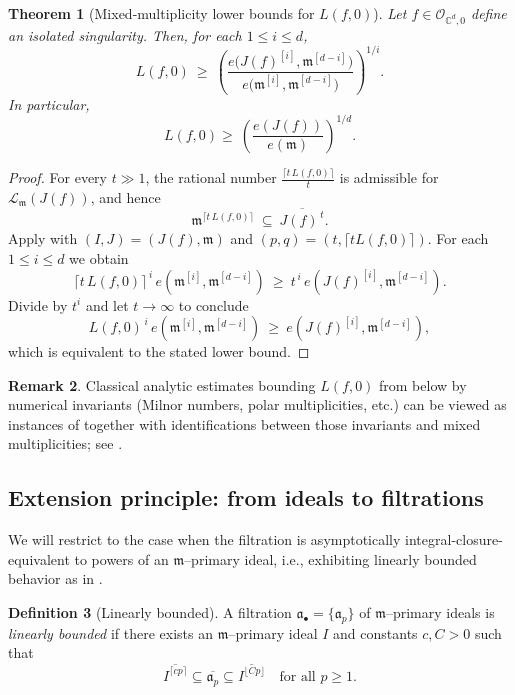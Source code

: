 \documentclass[12pt]{amsart}
\newcommand{\CC}{\mathbb{C}}
\newcommand{\m}{\mathfrak m}
\renewcommand{\a}{\mathfrak{a}}
\newcommand{\Loj}{\mathcal{L}} %
\newcommand{\abul}{{\a_\bullet}}
\theoremstyle{plain}
\newtheorem{theorem}{Theorem}[section]
\theoremstyle{definition}
\newtheorem{definition}[theorem]{Definition}
\newtheorem{remark}[theorem]{Remark}
\numberwithin{equation}{section}
\begin{document}
\begin{theorem}[Mixed-multiplicity lower bounds for $L(f,0)$]\label{thm:grad-mixed-lower}
Let $f\in\mathcal O_{\CC^d,0}$ define an isolated singularity.
Then, for each $1\le i\le d$,
\[
L(f,0)
\ \ge\
\left(\frac{e\bigl(J(f)^{[i]},\m^{[d-i]}\bigr)}
{e\bigl(\m^{[i]},\m^{[d-i]}\bigr)}\right)^{1/i}.
\]
In particular,
\[
L(f,0) \ge\ \left(\frac{e(J(f))}{e(\m)}\right)^{1/d}.
\]
\end{theorem}

\begin{proof}
For every $t\gg 1$, the rational number $\frac{\lceil t\,L(f,0)\rceil}{t}$ is admissible for $\Loj_{\m}(J(f))$, and hence
\[
\m^{\lceil t\,L(f,0)\rceil}\ \subseteq\ \overline{J(f)^{\,t}}.
\]
Apply  with $(I,J)=(J(f),\m)$ and $(p,q)=(t,\lceil tL(f,0)\rceil)$.
For each $1\le i\le d$ we obtain
\[
\lceil t\,L(f,0)\rceil^{\,i}\,e(\m^{[i]},\m^{[d-i]})
\ \ge\
t^{\,i}\,e(J(f)^{[i]},\m^{[d-i]}).
\]
Divide by $t^i$ and let $t\to\infty$ to conclude
\[
L(f,0)^{\,i}\,e(\m^{[i]},\m^{[d-i]})
\ \ge\
e(J(f)^{[i]},\m^{[d-i]}),
\]
which is equivalent to the stated lower bound.
\end{proof}

\begin{remark}\label{rem:classical-match}
Classical analytic estimates bounding $L(f,0)$ from below by numerical invariants
(Milnor numbers, polar multiplicities, etc.) can be viewed as instances of
\Cref{thm:grad-mixed-lower} together with identifications between those
invariants and mixed multiplicities; see \cite{Aus09, BE13}.
\end{remark}

\subsection{Extension principle: from ideals to filtrations}

We will restrict to the case when the filtration is asymptotically integral-closure-equivalent to powers of an $\m$--primary ideal, i.e., exhibiting linearly bounded behavior as in .

\begin{definition}[Linearly bounded]\label{def:power-like}
A filtration $\abul=\{\a_p\}$ of $\m$--primary ideals is \emph{linearly bounded}
if there exists an $\m$--primary ideal $I$ and constants $c,C>0$ such that
\[
\overline{I^{\lceil cp\rceil}}\subseteq \overline{\a_p}\subseteq \overline{I^{\lfloor Cp\rfloor}}
\quad \text{for all }p\ge1.
\]
\end{definition}
\end{document}
